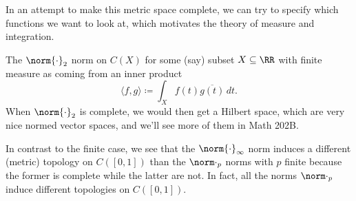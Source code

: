 \documentclass[../notes.tex]{subfiles}
\begin{document}
\begin{remark}
	In an attempt to make this metric space complete, we can try to specify which functions we want to look at, which motivates the theory of measure and integration.
\end{remark}
\begin{remark}
	The $\norm{\cdot}_2$ norm on $C(X)$ for some (say) subset $X\subseteq\RR$ with finite measure as coming from an inner product
	\[\langle f,g\rangle\coloneqq\int_Xf(t)\overline{g(t)}\,dt.\]
	When $\norm{\cdot}_2$ is complete, we would then get a Hilbert space, which are very nice normed vector spaces, and we'll see more of them in Math 202B.
\end{remark}
\begin{remark}[Nir]
	In contrast to the finite case, we see that the $\norm{\cdot}_\infty$ norm induces a different (metric) topology on $C([0,1])$ than the $\norm\cdot_p$ norms with $p$ finite because the former is complete while the latter are not. In fact, all the norms $\norm\cdot_p$ induce different topologies on $C([0,1])$.
\end{remark}
\end{document}
